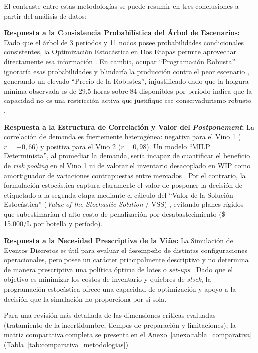 El contraste entre estas metodologías se puede resumir en tres conclusiones a partir del análisis de datos:

\noindent\textbf{Respuesta a la Consistencia Probabilística del Árbol de Escenarios: }Dado que el árbol de 3 períodos y 11 nodos posee probabilidades condicionales consistentes, la Optimización Estocástica en Dos Etapas permite aprovechar directamente esa información \cite{gupta2000two}. En cambio, ocupar ``Programación Robusta'' ignoraría esas probabilidades y blindaría la producción contra el peor escenario \cite{hu2020hybrid}, generando un elevado ``Precio de la Robustez'', injustificado dado que la holgura mínima observada es de 29,5 horas sobre 84 disponibles por período indica que la capacidad no es una restricción activa que justifique ese conservadurismo robusto \cite{lappas2016multi}.

\medskip
\noindent\textbf{Respuesta a la Estructura de Correlación y Valor del \textit{Postponement}: }La correlación de demanda es fuertemente heterogénea: negativa para el Vino 1 ($r = -0{,}66$) y positiva para el Vino 2 ($r = 0{,}98$). Un modelo ``MILP Determinista'', al promediar la demanda, sería incapaz de cuantificar el beneficio de \textit{risk pooling} en el Vino 1 ni de valorar el inventario desacoplado en WIP como amortiguador de variaciones contrapuestas entre mercados \cite{gunther2014block, lillo2025optimal}. Por el contrario, la formulación estocástica captura claramente el valor de posponer la decisión de etiquetado a la segunda etapa mediante el cálculo del ``Valor de la Solución Estocástica'' (\textit{Value of the Stochastic Solution} / VSS) \cite{cunha2017stochastic}, evitando planes rígidos que subestimarían el alto costo de penalización por desabastecimiento (\$ 15.000/L por botella y período).

\medskip
\noindent\textbf{Respuesta a la Necesidad Prescriptiva de la Viña: }La Simulación de Eventos Discretos es útil para evaluar el desempeño de distintas configuraciones operacionales, pero posee un carácter principalmente descriptivo y no determina de manera prescriptiva una política óptima de lotes o \textit{set-ups} \cite{jeon2016survey, review2024simula}. 
    Dado que el objetivo es minimizar los costos de inventario y quiebres de \textit{stock}, la programación estocástica ofrece una capacidad de optimización y apoyo a la decisión que la simulación no proporciona por sí sola.

Para una revisión más detallada de las dimensiones críticas evaluadas (tratamiento de la incertidumbre, tiempos de preparación y limitaciones), la matriz comparativa completa se presenta en el Anexo~\ref{anexo:tabla_comparativa} (Tabla~\ref{tab:comparativa_metodologias}).


